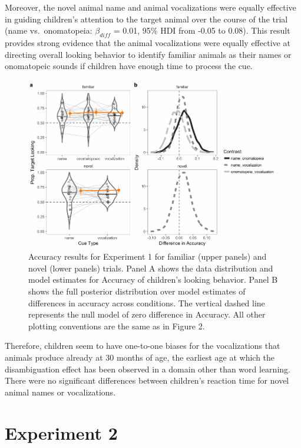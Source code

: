 \documentclass[english,floatsintext,man]{apa6}
\theoremstyle{definition}
\theoremstyle{definition}
\theoremstyle{definition}
\theoremstyle{remark}
\begin{document}
Moreover, the novel animal name and animal vocalizations were equally
effective in guiding children's attention to the target animal over the
course of the trial (name vs.~onomatopeia: \(\beta_{diff}\) = 0.01, 95\%
HDI from -0.05 to 0.08). This result provides strong evidence that the
animal vocalizations were equally effective at directing overall looking
behavior to identify familiar animals as their names or onomatopeic
sounds if children have enough time to process the cue.

\begin{figure}[tb]
\includegraphics[width=0.95\linewidth]{anime_manuscript_files/figure-latex/acc-plot-e1-1} \caption{Accuracy results for Experiment 1 for familiar (upper panels) and novel (lower panels) trials. Panel A shows the data distribution and model estimates for Accuracy of children's looking behavior. Panel B shows the full posterior distribution over model estimates of differences in accuracy across conditions. The vertical dashed line represents the null model of zero difference in Accuracy. All other plotting conventions are the same as in Figure 2.}\label{fig:acc-plot-e1}
\end{figure}

Therefore, children seem to have one-to-one biases for the vocalizations
that animals produce already at 30 months of age, the earliest age at
which the disambiguation effect has been observed in a domain other than
word learning. There were no significant differences between children's
reaction time for novel animal names or vocalizations.

\section{Experiment 2}\label{experiment-2}
\end{document}
